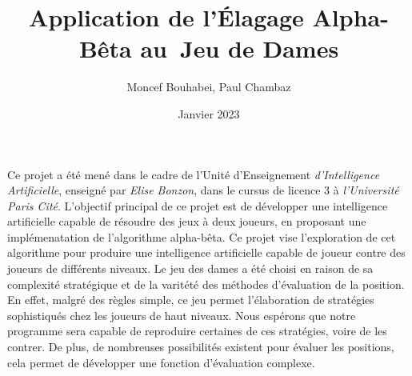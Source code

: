 \documentclass[a4paper,11pt]{article}
\title{\textbf{Application de l'Élagage Alpha-Bêta au Jeu de Dames}}
\author{Moncef Bouhabei, Paul Chambaz}
\date{Janvier 2023}
\begin{document}
\maketitle

Ce projet a été mené dans le cadre de l'Unité d'Enseignement
\emph{d'Intelligence Artificielle}, enseigné par \emph{Elise Bonzon}, dans le
cursus de licence 3 à \emph{l'Université Paris Cité}. L'objectif principal de ce
projet est de développer une intelligence artificielle capable de résoudre des
jeux à deux joueurs, en proposant une implémenatation de l'algorithme
alpha-bêta. Ce projet vise l'exploration de cet algorithme pour produire une
intelligence artificielle capable de joueur contre des joueurs de différents
niveaux. Le jeu des dames a été choisi en raison de sa complexité stratégique et
de la varitété des méthodes d'évaluation de la position. En effet, malgré des
règles simple, ce jeu permet l'élaboration de stratégies sophistiqués chez les
joueurs de haut niveaux. Nous espérons que notre programme sera capable de
reproduire certaines de ces stratégies, voire de les contrer. De plus, de
nombreuses possibilités existent pour évaluer les positions, cela permet de
développer une fonction d'évaluation complexe.

\hrulefill
\end{document}
